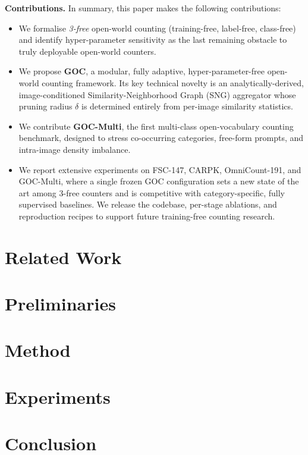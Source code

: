 \documentclass[letterpaper]{article}
\begin{document}
\textbf{Contributions.} In summary, this paper makes the following contributions:
\begin{itemize}
    \item We formalise \emph{3-free} open-world counting (training-free, label-free, class-free) and identify hyper-parameter sensitivity as the last remaining obstacle to truly deployable open-world counters.
    \item We propose \textbf{GOC}, a modular, fully adaptive, hyper-parameter-free open-world counting framework. Its key technical novelty is an analytically-derived, image-conditioned Similarity-Neighborhood Graph (SNG) aggregator whose pruning radius $\delta$ is determined entirely from per-image similarity statistics.
    \item We contribute \textbf{GOC-Multi}, the first multi-class open-vocabulary counting benchmark, designed to stress co-occurring categories, free-form prompts, and intra-image density imbalance.
    \item We report extensive experiments on FSC-147, CARPK, OmniCount-191, and GOC-Multi, where a single frozen GOC configuration sets a new state of the art among 3-free counters and is competitive with category-specific, fully supervised baselines. We release the codebase, per-stage ablations, and reproduction recipes to support future training-free counting research.
\end{itemize}

\section{Related Work}
\label{sec:related}

\section{Preliminaries}
\label{sec:prelim}

\section{Method}
\label{sec:method}

\section{Experiments}
\label{sec:experiments}

\section{Conclusion}
\label{sec:conclusion}



\end{document}
